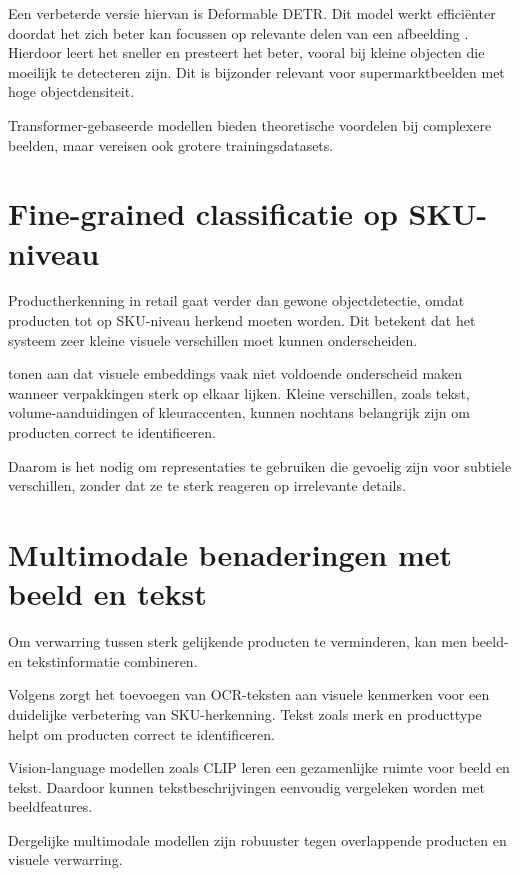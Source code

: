 Een verbeterde versie hiervan is Deformable DETR. Dit model werkt efficiënter doordat het zich beter kan focussen op relevante delen van een afbeelding \autocite{zhu2021}. Hierdoor leert het sneller en presteert het beter, vooral bij kleine objecten die moeilijk te detecteren zijn. Dit is bijzonder relevant voor supermarktbeelden met hoge objectdensiteit.

Transformer-gebaseerde modellen bieden theoretische voordelen bij complexere beelden, maar vereisen ook grotere trainingsdatasets.

\section{Fine-grained classificatie op SKU-niveau}

Productherkenning in retail gaat verder dan gewone objectdetectie, omdat producten tot op SKU-niveau herkend moeten worden. Dit betekent dat het systeem zeer kleine visuele verschillen moet kunnen onderscheiden.

\textcite{PETTERSSON202410549} tonen aan dat visuele embeddings vaak niet voldoende onderscheid maken wanneer verpakkingen sterk op elkaar lijken. Kleine verschillen, zoals tekst, volume-aanduidingen of kleuraccenten, kunnen nochtans belangrijk zijn om producten correct te identificeren.

Daarom is het nodig om representaties te gebruiken die gevoelig zijn voor subtiele verschillen, zonder dat ze te sterk reageren op irrelevante details.

\section{Multimodale benaderingen met beeld en tekst}

Om verwarring tussen sterk gelijkende producten te verminderen, kan men beeld- en tekstinformatie combineren.

Volgens \textcite{PETTERSSON202410549} zorgt het toevoegen van OCR-teksten aan visuele kenmerken voor een duidelijke verbetering van SKU-herkenning. Tekst zoals merk en producttype helpt om producten correct te identificeren.

Vision-language modellen zoals CLIP leren een gezamenlijke ruimte voor beeld en tekst. Daardoor kunnen tekstbeschrijvingen eenvoudig vergeleken worden met beeldfeatures.

Dergelijke multimodale modellen zijn robuuster tegen overlappende producten en visuele verwarring.

